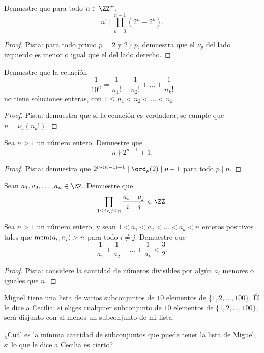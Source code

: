 \begin{probEG}
  Demuestre que para todo $n\in\ZZ^+$,
  \[n!\mid\prod_{k=0}^{n-1}(2^n-2^k).\]
\end{probEG}

\begin{proof}
  Pista: para todo primo $p=2$ y $2\nmid p$, demuestra que el $\nu_p$ del lado
  izquierdo es menor o igual que el del lado derecho.
\end{proof}

\begin{probEG}
  Demuestre que la ecuación
  \[\frac{1}{10^n}=\frac{1}{n_1!}+\frac{1}{n_2!}+\dots+\frac{1}{n_k!}\]
  no tiene soluciones enteras, con $1\le n_1<n_2<\dots<n_k$.
\end{probEG}

\begin{proof}
  Pista: demuestra que si la ecuación es verdadera, se cumple que
  $n=\nu_5(n_k!)$.
\end{proof}

\begin{probEG}
  Sea $n>1$ un número entero. Demuestre que
  \[n\nmid 2^{n-1}+1.\]
\end{probEG}

\begin{proof}
  Pista: demuestra que $2^{\nu_2(n-1)+1}\mid\ord_p(2)\mid p-1$ para todo
  $p\mid n$.
\end{proof}

\begin{probMG}
  Sean $a_1,a_2,\dots,a_n\in\ZZ$. Demuestre que
  \[\prod_{1\le i<j\le n}\frac{a_i-a_j}{i-j}\in\ZZ.\]
\end{probMG}

\begin{probMR}
  Sea $n>1$ un número entero, y sean $1<a_1<a_2<\dots<a_k<n$ enteros positivos
  tales que $\operatorname{mcm}(a_i,a_j)>n$ para todo $i\ne j$. Demuestre que
  \[\frac{1}{a_1}+\frac{1}{a_2}+\dots+\frac{1}{a_k}<\frac32.\]
\end{probMR}

\begin{proof}
  Pista: considere la cantidad de números divisibles por algún $a_i$ menores o
  iguales que $n$.
\end{proof}


\begin{probEG}
  Miguel tiene una lista de varios subconjuntos de $10$ elementos de
  $\{1,2,\dots,100\}$. Él le dice a Cecilia: si eliges cualquier subconjunto de
  $10$ elementos de $\{1,2,\dots,100\}$, será disjunto con al menos un
  subconjunto de mi lista.

  ¿Cuál es la mínima cantidad de subconjuntos que puede tener la lista de
  Miguel, si lo que le dice a Cecilia es cierto?
\end{probEG}

